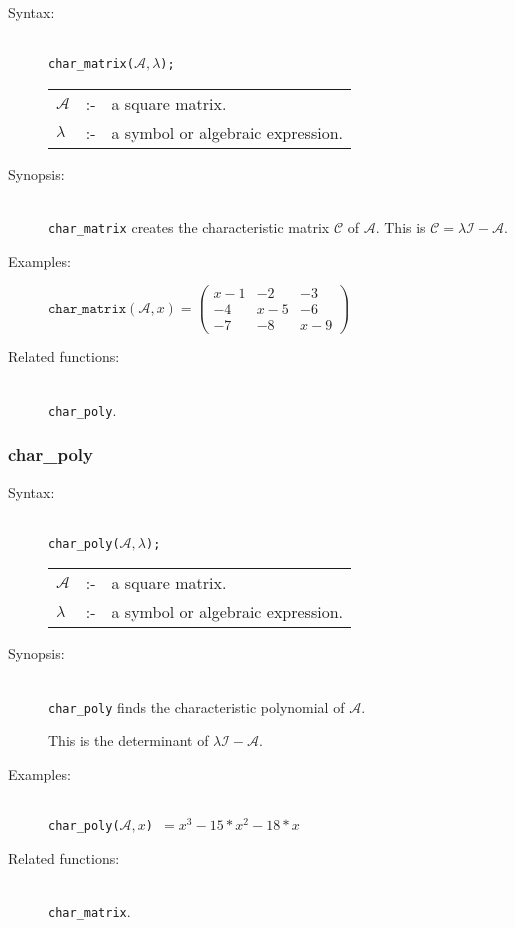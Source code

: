 \begin{description}
\item[Syntax:]\mbox{}\\
\texttt{char\_matrix($\mathcal{A},\lambda$);}\\[2mm]
\begin{tabular}{l l l}
$\mathcal{A}$ &:-& a square matrix. \\
$\lambda$  &:-& a symbol or algebraic expression. 
\end{tabular}

\item[Synopsis:]\mbox{}\\
\texttt{char\_matrix} creates the characteristic matrix $\mathcal{C}$ of 
$\mathcal{A}$.  This is $\mathcal{C} = \lambda \mathcal{I} - \mathcal{A}$. 

\item[Examples:]
\begin{flushleft}  
\begin{math}  
\texttt{char\_matrix}(\mathcal{A},x) = 
\begin{pmatrix} x-1 & -2 & -3 \\ -4 & x-5 & -6 \\ -7 & -8 & x-9 \end{pmatrix}  
\end{math}  
\end{flushleft}

\item[Related functions:]\mbox{}\\
\texttt{char\_poly}. 
\end{description}


\subsubsection{char\_poly}
\label{linalg:char_poly}

\begin{description}
\item[Syntax:]\mbox{}\\
\texttt{char\_poly($\mathcal{A},\lambda$);}\\[2mm]
\begin{tabular}{l l l}
$\mathcal{A}$ &:-& a square matrix. \\
$\lambda$ &:-& a symbol or algebraic expression.
\end{tabular}

\item[Synopsis:]\mbox{}\\
\texttt{char\_poly} finds the characteristic polynomial of
                $\mathcal{A}$.  

This is the determinant of $\lambda \mathcal{I} - \mathcal{A}$.

\item[Examples:]\mbox{}\\
\texttt{char\_poly($\mathcal{A},x$) $= x^3-15*x^2-18*x$} 

\item[Related functions:]\mbox{}\\
 \texttt{char\_matrix}. 
\end{description}


